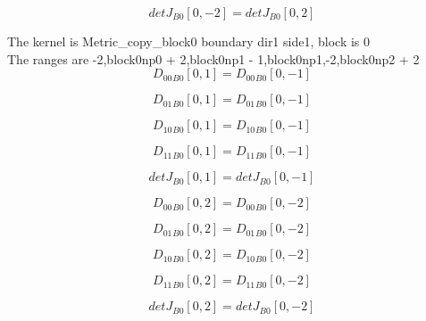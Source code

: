 \documentclass{article}
\begin{document}
\begin{dmath}{detJ{_{B0}}}[{0,-2}] = {detJ{_{B0}}}[{0,2}]\end{dmath}

\noindent The kernel is Metric_copy_block0 boundary dir1 side1, block is 0\\\noindent The ranges are -2,block0np0 + 2,block0np1 - 1,block0np1,-2,block0np2 + 2\\\begin{dmath}{D_{00}{_{B0}}}[{0,1}] = {D_{00}{_{B0}}}[{0,-1}]\end{dmath}

\begin{dmath}{D_{01}{_{B0}}}[{0,1}] = {D_{01}{_{B0}}}[{0,-1}]\end{dmath}

\begin{dmath}{D_{10}{_{B0}}}[{0,1}] = {D_{10}{_{B0}}}[{0,-1}]\end{dmath}

\begin{dmath}{D_{11}{_{B0}}}[{0,1}] = {D_{11}{_{B0}}}[{0,-1}]\end{dmath}

\begin{dmath}{detJ{_{B0}}}[{0,1}] = {detJ{_{B0}}}[{0,-1}]\end{dmath}

\begin{dmath}{D_{00}{_{B0}}}[{0,2}] = {D_{00}{_{B0}}}[{0,-2}]\end{dmath}

\begin{dmath}{D_{01}{_{B0}}}[{0,2}] = {D_{01}{_{B0}}}[{0,-2}]\end{dmath}

\begin{dmath}{D_{10}{_{B0}}}[{0,2}] = {D_{10}{_{B0}}}[{0,-2}]\end{dmath}

\begin{dmath}{D_{11}{_{B0}}}[{0,2}] = {D_{11}{_{B0}}}[{0,-2}]\end{dmath}

\begin{dmath}{detJ{_{B0}}}[{0,2}] = {detJ{_{B0}}}[{0,-2}]\end{dmath}
\end{document}
